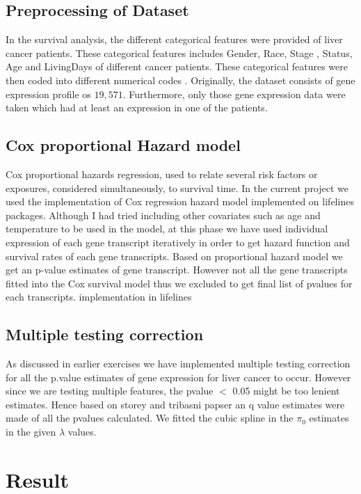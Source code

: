 \documentclass{article}
\begin{document}
	\subsection {Preprocessing of Dataset}
In the survival analysis, the different categorical features were provided of liver cancer patients. These categorical features includes Gender, Race, Stage , Status, Age and LivingDays of different cancer patients.  These categorical features were then coded into different numerical codes . Originally, the dataset consists of gene expression profile os $19,571$. Furthermore, only those gene expression data were taken which had at least an expression in one of the patients.  

	\subsection{Cox proportional Hazard model}
	 Cox proportional hazards regression, used to relate several risk factors or exposures, considered simultaneously, to survival time. In the current project we used the implementation of Cox regression hazard model implemented on lifelines packages. Although I had tried including other covariates such as age and temperature to be used in the model, at this phase we have used individual expression of each gene transcript iteratively in order to get hazard function and survival rates of each gene transcripts. Based on proportional hazard model we get an p-value estimates of gene transcript. However not all the gene transcripts fitted into the Cox survival model thus we excluded to get final list of pvalues for each transcripts. implementation in lifelines \cite{lifelines} 
	 
	\subsection {Multiple testing correction}
	As discussed in earlier exercises we have  implemented multiple testing correction for all the p.value estimates of gene expression for liver cancer to occur. However since we are testing multiple features, the pvalue $<$ 0.05 might be too lenient estimates. Hence based on storey and tribasni papser \cite {} an q value estimates were made of all the pvalues calculated. We fitted the cubic spline in the $\pi_0$ estimates in the given  $\lambda$ values.
	 


 \section{Result}
 
\end{document}
